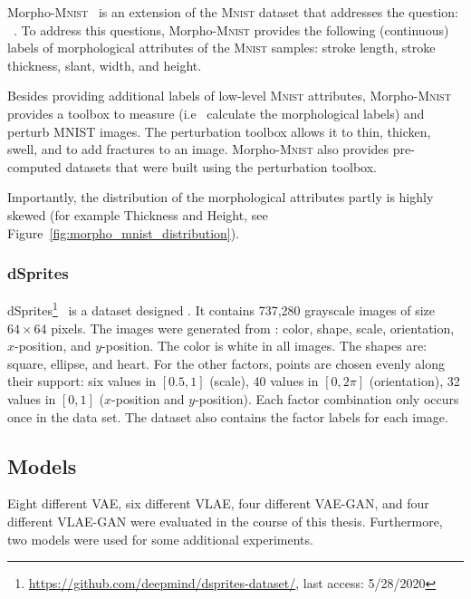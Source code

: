 Morpho-\textsc{Mnist}~\citep{castro2019morpho} is an extension of the \textsc{Mnist} dataset that addresses the question:  ~\citep{castro2019morpho}.
To address this questions, Morpho-\textsc{Mnist} provides the following (continuous) labels of morphological attributes of the \textsc{Mnist} samples: stroke length, stroke thickness, slant, width, and height.

Besides providing additional labels of low-level \textsc{Mnist} attributes, Morpho-\textsc{Mnist} provides a toolbox to measure (i.e~ calculate the morphological labels) and perturb MNIST images.
The perturbation toolbox allows it to thin, thicken, swell, and to add fractures to an image.
Morpho-\textsc{Mnist} also provides pre-computed datasets that were built using the perturbation toolbox.

Importantly, the distribution of the morphological attributes partly is highly skewed (for example Thickness and Height, see Figure~\ref{fig:morpho_mnist_distribution}).

\subsubsection{dSprites}
dSprites\footnote{\href{https://github.com/deepmind/dsprites-dataset/}{https://github.com/deepmind/dsprites-dataset/}, last access: 5/28/2020}~\citep{dsprites17} is a dataset designed .
It contains 737,280 grayscale images of size $64\times 64$ pixels.
The images were generated from : color, shape, scale, orientation, $x$-position, and $y$-position.
The color is white in all images.
The shapes are: square, ellipse, and heart.
For the other factors, points are chosen evenly along their support: six values in $[0.5, 1]$ (scale), 40 values in $[0, 2\pi]$ (orientation), 32 values in $[0, 1]$ ($x$-position and $y$-position).
Each factor combination only occurs once in the data set.
The dataset also contains the factor labels for each image.

\subsection{Models}\label{subsec:models}

Eight different \ac{VAE}, six different \ac{VLAE}, four different \ac{VAE}-\ac{GAN}, and four different \ac{VLAE}-\ac{GAN} were evaluated in the course of this thesis.
Furthermore, two  models were used for some additional experiments.

